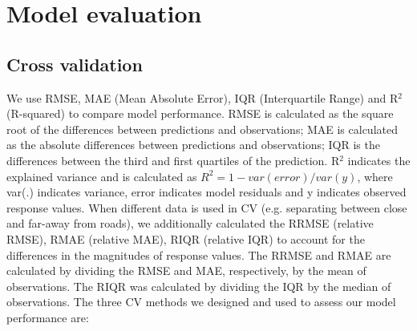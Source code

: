 \documentclass{article}
\begin{document}
\section{Model evaluation}

\subsection{Cross validation}
We use RMSE, MAE (Mean Absolute Error), IQR (Interquartile Range) and R$^2$ (R-squared) to compare model performance. RMSE is calculated as the square root of the differences between predictions and observations; MAE is calculated as the absolute differences between predictions and observations; IQR is the differences between the third and first quartiles of the prediction. R$^2$ indicates the explained variance and is calculated as $R^2 = 1- var(error) / var(y)$, where var(.) indicates variance, error indicates model residuals and y indicates observed response values. When different data is used in CV (e.g. separating between close and far-away from roads), we additionally calculated the RRMSE (relative RMSE), RMAE (relative MAE), RIQR (relative IQR) to account for the differences in the magnitudes of response values. The RRMSE and RMAE are calculated by dividing the RMSE and MAE, respectively, by the mean of observations. The RIQR was calculated by dividing the IQR by the median of observations. The three CV methods we designed and used to assess our model performance are: 
\end{document}
